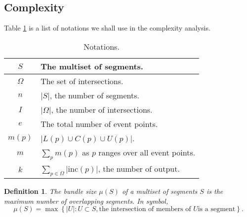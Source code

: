 \documentclass[a4paper]{article}
\newtheorem{definition}{Definition}
\begin{document}
\subsection{Complexity}
Table \ref{tab:not} is a list of notations we shall use in the complexity analysis.
\begin{table}[htb]
  \centering
  \begin{tabular}{|c|l|}
  \hline
    $S$ & The multiset of segments. \\
    \hline
    $\Omega$ & The set of intersections. \\
    \hline
    $n$ & $\vert S  \vert$, the number of segments.  \\
    \hline
    $I$ & $\vert \Omega \vert$, the number of intersections. \\
    \hline
    $e$ & The total number of event points. \\
    \hline
    $m(p)$ & $\vert L(p) \cup C(p) \cup U(p)  \vert$. \\
    \hline
    $m$ & $\sum_{p} m(p)$ as $p$ ranges over all event points.  \\
    \hline
    $k$ & $\sum_{p \in \Omega} \vert \text{inc}(p) \vert$, the number of output. \\
    \hline
  \end{tabular}
  \caption{Notations.}
  \label{tab:not}
\end{table}

\begin{definition}
  The \emph{bundle size} $\mu(S)$ of a multiset of segments $S$ is
  the maximum number of overlapping segments. 
  In symbol, 
  \begin{equation}
    \mu(S) = \max \left\{ \vert U \vert : U \subset S, 
    \text{the intersection of members of } U \text{is a segment} \right\}. 
  \end{equation}
\end{definition}


\newcommand{\bigO}[1]{\mathcal{O}(#1)}
\end{document}
